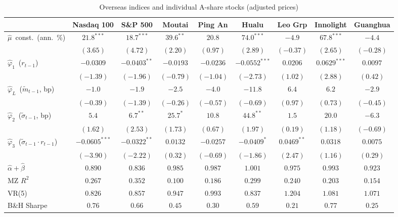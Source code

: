 \begin{table}[htbp]\centering
\caption{Overseas indices and individual A-share stocks (adjusted prices)}\label{tab:stk_en}
\footnotesize\setlength{\tabcolsep}{4pt}
\begin{threeparttable}
\begin{tabular}{lcccccccc}
\toprule
 & Nasdaq 100 & S\&P 500 & Moutai & Ping An & Hualu & Leo Grp & Innolight & Guanghua \\
\midrule
$\hat\mu$~const.\ (ann.\ \%) & $21.8^{***}$ & $18.7^{***}$ & $39.6^{**}$ & $20.8$ & $74.0^{***}$ & $-4.9$ & $67.8^{***}$ & $-4.4$ \\
 & $(3.65)$ & $(4.72)$ & $(2.20)$ & $(0.97)$ & $(2.89)$ & $(-0.37)$ & $(2.65)$ & $(-0.28)$ \\[2pt]
$\hat\varphi_1$~($r_{t-1}$) & $-0.0309$ & $-0.0403^{**}$ & $-0.0193$ & $-0.0236$ & $-0.0552^{***}$ & $0.0206$ & $0.0629^{***}$ & $0.0097$ \\
 & $(-1.39)$ & $(-1.96)$ & $(-0.79)$ & $(-1.04)$ & $(-2.73)$ & $(1.02)$ & $(2.88)$ & $(0.42)$ \\[2pt]
$\hat\varphi_L$~($\tilde m_{t-1}$, bp) & $-1.0$ & $-1.9$ & $-2.5$ & $-4.0$ & $-11.8$ & $6.4$ & $6.2$ & $-2.9$ \\
 & $(-0.39)$ & $(-1.39)$ & $(-0.26)$ & $(-0.57)$ & $(-0.69)$ & $(0.97)$ & $(0.73)$ & $(-0.45)$ \\[2pt]
$\hat\varphi_2$~($\tilde\sigma_{t-1}$, bp) & $5.4$ & $6.7^{**}$ & $25.7^{*}$ & $10.8$ & $44.8^{**}$ & $1.5$ & $20.0$ & $-6.3$ \\
 & $(1.62)$ & $(2.53)$ & $(1.73)$ & $(0.67)$ & $(1.97)$ & $(0.19)$ & $(1.18)$ & $(-0.69)$ \\[2pt]
$\hat\varphi_3$~($\tilde\sigma_{t-1}\!\cdot\! r_{t-1}$) & $-0.0605^{***}$ & $-0.0322^{**}$ & $0.0132$ & $-0.0257$ & $-0.0409^{*}$ & $0.0469^{**}$ & $0.0318$ & $0.0075$ \\
 & $(-3.90)$ & $(-2.22)$ & $(0.32)$ & $(-0.69)$ & $(-1.86)$ & $(2.47)$ & $(1.16)$ & $(0.29)$ \\[2pt]
\midrule
$\hat\alpha+\hat\beta$ & $0.890$ & $0.836$ & $0.985$ & $0.987$ & $1.001$ & $0.975$ & $0.993$ & $0.923$ \\
MZ $R^2$ & $0.267$ & $0.352$ & $0.100$ & $0.186$ & $0.299$ & $0.240$ & $0.203$ & $0.154$ \\
VR(5) & $0.826$ & $0.857$ & $0.947$ & $0.993$ & $0.837$ & $1.204$ & $1.081$ & $1.071$ \\
B\&H Sharpe & $0.76$ & $0.66$ & $0.45$ & $0.30$ & $0.59$ & $0.21$ & $0.77$ & $0.25$ \\

\end{tabular}
\end{threeparttable}
\end{table}
